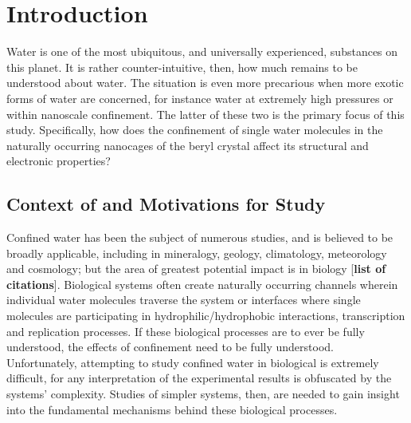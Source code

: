 
\chapter{Introduction}
\label{chap:introduction}
\ifpdf
    \graphicspath{{Introduction/Figures/PNG/}{Introduction/Figures/PDF/}{Introduction/Figures/}}
\else
    \graphicspath{{Introduction/Figures/EPS/}{Introduction/Figures/}}
\fi

Water is one of the most ubiquitous, and universally experienced, substances on this planet. It is rather counter-intuitive, then, how much remains to be understood about water. The situation is even more precarious when more exotic forms of water are concerned, for instance water at extremely high pressures or within nanoscale confinement. The latter of these two is the primary focus of this study. Specifically, how does the confinement of single water molecules in the naturally occurring nanocages of the beryl crystal affect its structural and electronic properties? 



\section{Context of and Motivations for Study}
\label{motivations}

Confined water has been the subject of numerous studies, and is believed to be broadly applicable, including in mineralogy, geology, climatology, meteorology and cosmology; but the area of greatest potential impact is in biology [\textbf{list of citations}]. Biological systems often create naturally occurring channels wherein individual water molecules traverse the system or interfaces where single molecules are participating in hydrophilic/hydrophobic interactions, transcription and replication processes. If these biological processes are to ever be fully understood, the effects of confinement need to be fully understood. Unfortunately, attempting to study confined water in biological is extremely difficult, for any interpretation of the experimental results is obfuscated by the systems’ complexity. Studies of simpler systems, then, are needed to gain insight into the fundamental mechanisms behind these biological processes.  

